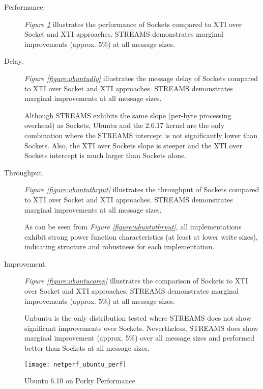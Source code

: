 \documentclass[letterpaper,final,notitlepage,twocolumn,10pt,twoside]{article}
\begin{document}
\begin{description}

\item[Performance.]

\textit{Figure \ref{figure:ubuntuperf}}
illustrates the performance of Sockets compared to XTI over Socket and XTI
approaches.  STREAMS demonstrates marginal improvements (approx. 5\%) at all message
sizes.

\item[Delay.]

\textit{Figure \ref{figure:ubuntudly}}
illustrates the message delay of Sockets compared to XTI over Socket and XTI
approaches.  STREAMS demonstrates marginal improvements at all message sizes.

Although STREAMS exhibits the same slope (per-byte processing overhead) as
Sockets, Ubuntu and the 2.6.17 kernel are the only combination where the
STREAMS intercept is not significantly lower than Sockets.  Also, the XTI over
Sockets slope is steeper and the XTI over Sockets intercept is much larger
than Sockets alone.

\item[Throughput.]

\textit{Figure \ref{figure:ubuntuthrput}}
illustrates the throughput of Sockets compared to XTI over Socket and XTI
approaches.  STREAMS demonstrates marginal improvements at all message
sizes.

As can be seen from \textit{Figure \ref{figure:ubuntuthrput}}, all
implementations exhibit strong power function characteristics (at least at
lower write sizes), indicating structure and robustness for each
implementation.

\item[Improvement.]

\textit{Figure \ref{figure:ubuntucomp}}
illustrates the comparison of Sockets to XTI over Socket and XTI approaches.
STREAMS demonstrates marginal improvements (approx. 5\%) at all message sizes.

Unbuntu is the only distribution tested where STREAMS does not show
significant improvements over Sockets.  Nevertheless, STREAMS does show
marginal improvement (approx. 5\%) over all message sizes and performed better than
Sockets at all message sizes.

\end{description}

\begin{figure}[p]
\center\texttt{[image: netperf\_ubuntu\_perf]}
\caption[Ubuntu 6.10 on Porky Performance]{Ubuntu 6.10 on Porky Performance}
\label{figure:ubuntuperf}
\end{figure}
\end{document}
